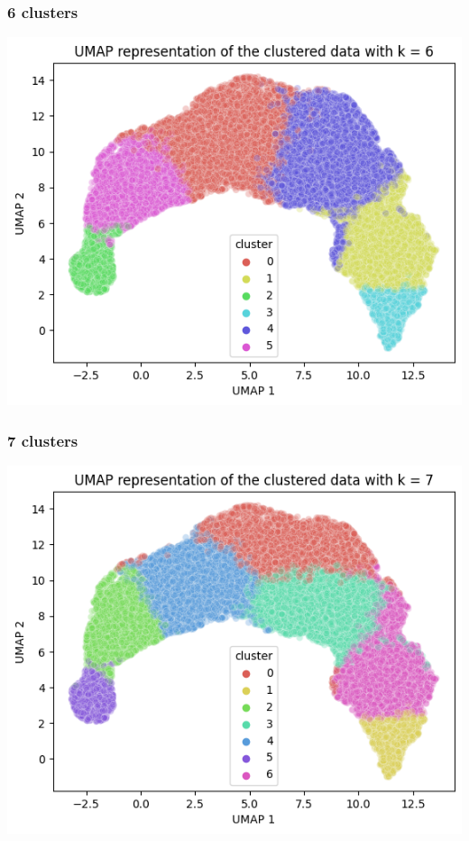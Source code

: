 \documentclass{article}
\begin{document}
\subsubsection*{6 clusters}

\begin{center}
    \includegraphics[scale=0.5]{./img/umap_6.png}
\end{center}

\subsubsection*{7 clusters}

\begin{center}
    \includegraphics[scale=0.5]{./img/umap_7.png}
\end{center}
\end{document}

